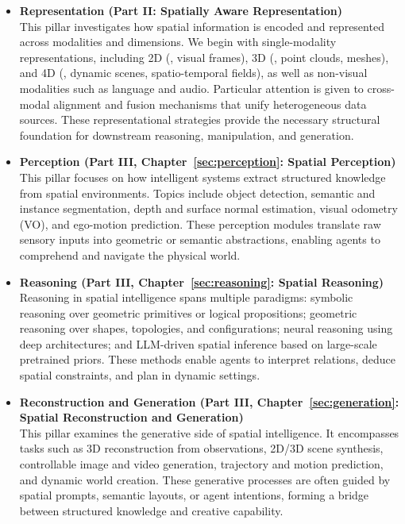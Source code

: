 \begin{itemize}[leftmargin=2em,itemsep=0.35em]
    \item \textbf{Representation (Part II: Spatially Aware Representation)} \\
    This pillar investigates how spatial information is encoded and represented across modalities and dimensions. We begin with single-modality representations, including 2D (\eg, visual frames), 3D (\eg, point clouds, meshes), and 4D (\eg, dynamic scenes, spatio-temporal fields), as well as non-visual modalities such as language and audio. Particular attention is given to cross-modal alignment and fusion mechanisms that unify heterogeneous data sources. These representational strategies provide the necessary structural foundation for downstream reasoning, manipulation, and generation.

    \item \textbf{Perception (Part III, Chapter~\ref{sec:perception}: Spatial Perception)} \\
    This pillar focuses on how intelligent systems extract structured knowledge from spatial environments. Topics include object detection, semantic and instance segmentation, depth and surface normal estimation, visual odometry (VO), and ego-motion prediction. These perception modules translate raw sensory inputs into geometric or semantic abstractions, enabling agents to comprehend and navigate the physical world.

    \item \textbf{Reasoning (Part III, Chapter~\ref{sec:reasoning}: Spatial Reasoning)} \\
    Reasoning in spatial intelligence spans multiple paradigms: symbolic reasoning over geometric primitives or logical propositions; geometric reasoning over shapes, topologies, and configurations; neural reasoning using deep architectures; and LLM-driven spatial inference based on large-scale pretrained priors. These methods enable agents to interpret relations, deduce spatial constraints, and plan in dynamic settings.

    \item \textbf{Reconstruction and Generation (Part III, Chapter~\ref{sec:generation}: Spatial Reconstruction and Generation)} \\
    This pillar examines the generative side of spatial intelligence. It encompasses tasks such as 3D reconstruction from observations, 2D/3D scene synthesis, controllable image and video generation, trajectory and motion prediction, and dynamic world creation. These generative processes are often guided by spatial prompts, semantic layouts, or agent intentions, forming a bridge between structured knowledge and creative capability.



\end{itemize}
